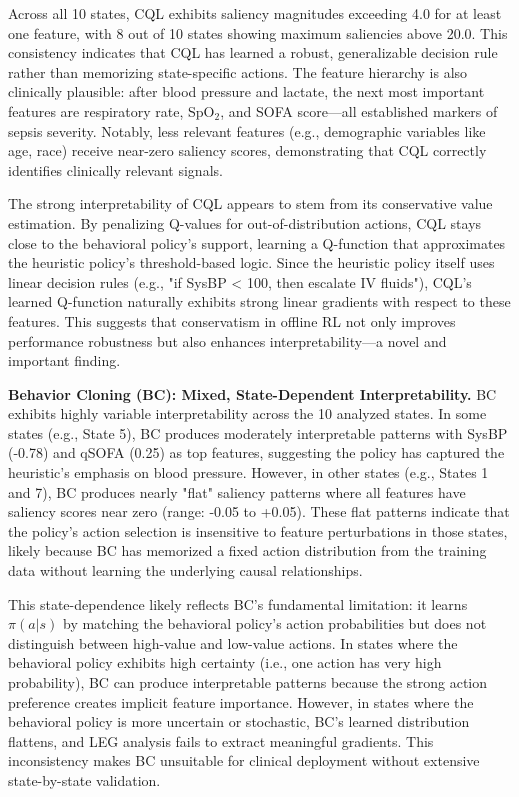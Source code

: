 Across all 10 states, CQL exhibits saliency magnitudes exceeding 4.0 for at least one feature, with 8 out of 10 states showing maximum saliencies above 20.0. This consistency indicates that CQL has learned a robust, generalizable decision rule rather than memorizing state-specific actions. The feature hierarchy is also clinically plausible: after blood pressure and lactate, the next most important features are respiratory rate, SpO$_2$, and SOFA score—all established markers of sepsis severity. Notably, less relevant features (e.g., demographic variables like age, race) receive near-zero saliency scores, demonstrating that CQL correctly identifies clinically relevant signals.

The strong interpretability of CQL appears to stem from its conservative value estimation. By penalizing Q-values for out-of-distribution actions, CQL stays close to the behavioral policy's support, learning a Q-function that approximates the heuristic policy's threshold-based logic. Since the heuristic policy itself uses linear decision rules (e.g., "if SysBP < 100, then escalate IV fluids"), CQL's learned Q-function naturally exhibits strong linear gradients with respect to these features. This suggests that conservatism in offline RL not only improves performance robustness but also enhances interpretability—a novel and important finding.

\textbf{Behavior Cloning (BC): Mixed, State-Dependent Interpretability.} BC exhibits highly variable interpretability across the 10 analyzed states. In some states (e.g., State 5), BC produces moderately interpretable patterns with SysBP (-0.78) and qSOFA (0.25) as top features, suggesting the policy has captured the heuristic's emphasis on blood pressure. However, in other states (e.g., States 1 and 7), BC produces nearly "flat" saliency patterns where all features have saliency scores near zero (range: -0.05 to +0.05). These flat patterns indicate that the policy's action selection is insensitive to feature perturbations in those states, likely because BC has memorized a fixed action distribution from the training data without learning the underlying causal relationships.

This state-dependence likely reflects BC's fundamental limitation: it learns $\pi(a|s)$ by matching the behavioral policy's action probabilities but does not distinguish between high-value and low-value actions. In states where the behavioral policy exhibits high certainty (i.e., one action has very high probability), BC can produce interpretable patterns because the strong action preference creates implicit feature importance. However, in states where the behavioral policy is more uncertain or stochastic, BC's learned distribution flattens, and LEG analysis fails to extract meaningful gradients. This inconsistency makes BC unsuitable for clinical deployment without extensive state-by-state validation.

